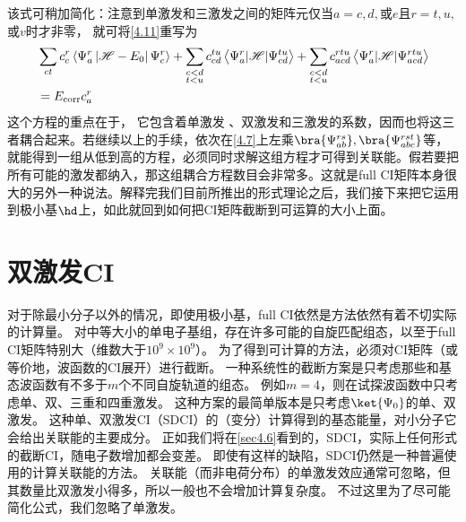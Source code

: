 该式可稍加简化：注意到单激发和三激发之间的矩阵元仅当$a=c,d,$或$e$且$r=t,u,$或$v$时才非零，
就可将\autoref{4.11}重写为
\begin{align}
&\sum_{c t} c_{c}^{r}\left\langle\Psi_{a}^{r}\left|\mathscr{H}-E_{0}\right| \Psi_{c}^{r}\right\rangle+\sum_{\substack{c<d \\ t<u}} c_{cd}^{tu}\left\langle\Psi_{a}^{r}|\mathscr{H}| \Psi_{c d}^{tu}\right\rangle+\sum_{\substack{c<d\\ t<u}} c_{acd}^{rtu}\left\langle\Psi_{a}^{r}|\mathscr{H}| \Psi_{acd}^{rtu}\right\rangle \notag \\
&=E_{\mathrm{corr}} c_{a}^{r}
\label{4.12}
\end{align}
这个方程的重点在于，
它包含着单激发
、双激发和三激发的系数，因而也将这三者耦合起来。若继续以上的手续，依次在\autoref{4.7}上左乘$\bra{\Psi_{ab}^{rs}},\bra{\Psi_{abc}^{rst}}$等，就能得到一组从低到高的方程，必须同时求解这组方程才可得到关联能。假若要把所有可能的激发都纳入，那这组耦合方程数目会非常多。这就是full CI矩阵本身很大的另外一种说法。解释完我们目前所推出的形式理论之后，我们接下来把它运用到极小基$\hd$上，如此就回到如何把CI矩阵截断到可运算的大小上面。





















\section{双激发CI}\mbox{}
\label{sec4.2}
对于除最小分子以外的情况，即使用极小基，full CI依然是方法依然有着不切实际的计算量。
对中等大小的单电子基组，存在许多可能的自旋匹配组态，以至于full CI矩阵特别大（维数大于$10^9\times 10^9$）。
为了得到可计算的方法，必须对CI矩阵（或等价地，波函数的CI展开）进行截断。
一种系统性的截断方案是只考虑那些和\hft 基态波函数有不多于$m$个不同自旋轨道的组态。
例如$m=4$，则在试探波函数中只考虑单、双、三重和四重激发。
这种方案的最简单版本是只考虑$\ket{\Psi_0}$的单、双激发。
这种单、双激发CI（SDCI）的（变分）计算得到的基态能量，对小分子它会给出关联能的主要成分。
正如我们将在\autoref{sec4.6}看到的，SDCI，实际上任何形式的截断CI，随电子数增加都会变差。
即使有这样的缺陷，SDCI仍然是一种普遍使用的计算关联能的方法。
关联能（而非电荷分布）的单激发效应通常可忽略，但其数量比双激发小得多，所以一般也不会增加计算复杂度。
不过这里为了尽可能简化公式，我们忽略了单激发。

